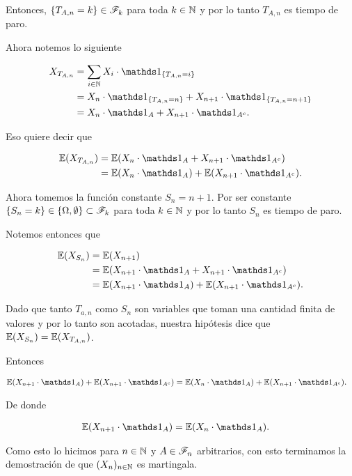 	Entonces, $\{ T_{A,n} = k\} \in \mathscr{F}_k$ para toda $k \in \mathbb{N}$ y por lo tanto $T_{A,n}$ es tiempo de paro.\pn

    Ahora notemos lo siguiente
    
    \begin{align}
    	X_{T_{A,n}} 	&=		\sum_{i \in \N} X_i \cdot  \indic_{\{T_{A,n}=i\}}						\\
    					&=		X_n \cdot  \indic_{\{T_{A,n}=n\}} + X_{n+1} \cdot  \indic_{\{T_{A,n}=n+1\}}	\\
    					&=		X_n \cdot  \indic_{A} + X_{n+1} \cdot  \indic_{A^c}.
    \end{align}\pn
    
    Eso quiere decir que
    
    \begin{align}
    	\E(X_{T_{A,n}}) 	&=	\E(X_n \cdot  \indic_{A} + X_{n+1} \cdot  \indic_{A^c})		\\
							&=	\E(X_n \cdot  \indic_{A}) + \E(X_{n+1} \cdot  \indic_{A^c}).
    \end{align}\pn
    
    Ahora tomemos la función constante $S_n = n+1$. Por ser constante \\
    $\{S_n = k\} \in \{ \Omega, \emptyset\} \subset \mathscr{F}_k$ para toda $k \in \mathbb{N}$
    y por lo tanto $S_n$ es tiempo de paro.\pn
    
    Notemos entonces que
    
    \begin{align}
    	\E(X_{S_n}) 	&= 		\E(X_{n+1}) 													\\
    					&=		\E(X_{n+1} \cdot \indic_A + X_{n+1} \cdot \indic_{A^c}) 		\\
    					&=		\E(X_{n+1} \cdot \indic_A) +\E( X_{n+1} \cdot \indic_{A^c}). 
    \end{align}
    
    Dado que tanto $T_{a,n}$ como $S_n$ son variables que toman una cantidad finita de valores y por lo tanto son acotadas, 
    nuestra hipótesis dice que \\
    $\mathbb{E}(X_{S_n}) = \mathbb{E}(X_{T_{A,n}})$.\pn
    
    Entonces
    
    \begin{align}
		\E(X_{n+1} \cdot \indic_A) +\E( X_{n+1} \cdot \indic_{A^c}) &=  \E(X_n \cdot  \indic_{A}) + \E(X_{n+1} \cdot  \indic_{A^c}).
    \end{align}\pn
    
    De donde
    
    \begin{align}
			\E(X_{n+1} \cdot \indic_A) &=	\E(X_n \cdot  \indic_{A}).
    \end{align}\pn
    
    Como esto lo hicimos para $n \in \mathbb{N}$ y $A \in \mathscr{F}_n$ arbitrarios, con esto terminamos la demostración de que $(X_n)_{n \in \mathbb{N}}$ es
    martingala.